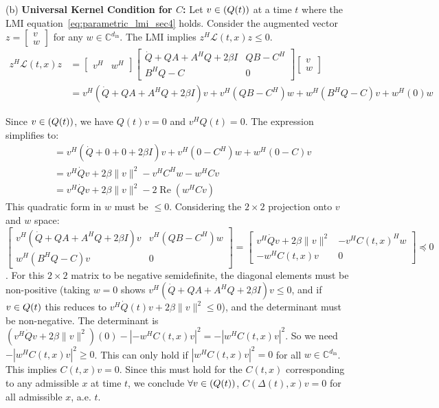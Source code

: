 \documentclass[10pt]{article} %
\def\eqref#1{equation~\ref{#1}}
\DeclareMathOperator{\realPart}{Re}                     %
\let\ker\relax\DeclareMathOperator{\ker}{Ker}           %
\theoremstyle{definition}
\begin{document}
(b) \textbf{Universal Kernel Condition for $C$:} Let $v \in \ker(Q(t))$ at a time $t$ where the LMI \eqref{eq:parametric_lmi_sec4} holds. Consider the augmented vector $z = \begin{bmatrix} v \\ w \end{bmatrix}$ for any $w \in \mathbb{C}^{d_{\mathrm{in}}}$. The LMI implies $z^H \mathcal{L}(t, x) z \le 0$.
\begin{align*} z^H \mathcal{L}(t, x) z &= \begin{bmatrix} v^H & w^H \end{bmatrix} \begin{bmatrix} \dot Q + QA + A^H Q + 2\beta I & QB - C^H \\ B^H Q - C & 0 \end{bmatrix} \begin{bmatrix} v \\ w \end{bmatrix} \\ &= v^H(\dot Q + QA + A^H Q + 2\beta I)v + v^H(QB - C^H)w + w^H(B^H Q - C)v + w^H(0)w \end{align*}

Since $v \in \ker(Q(t))$, we have $Q(t)v = 0$ and $v^H Q(t) = 0$. The expression simplifies to:
\begin{align*} &= v^H(\dot Q + 0 + 0 + 2\beta I)v + v^H(0 - C^H)w + w^H(0 - C)v \\ &= v^H \dot Q v + 2\beta \|v\|^2 - v^H C^H w - w^H C v \\ &= v^H \dot Q v + 2\beta \|v\|^2 - 2 \realPart(w^H C v) \end{align*}
This quadratic form in $w$ must be $\le 0$. Considering the $2 \times 2$ projection onto $v$ and $w$ space:
$\begin{bmatrix} v^H(\dot Q + QA + A^H Q + 2\beta I)v & v^H(QB - C^H)w \\ w^H(B^H Q - C)v & 0 \end{bmatrix} = \begin{bmatrix} v^H \dot Q v + 2\beta \|v\|^2 & -v^H C(t,x)^H w \\ -w^H C(t,x) v & 0 \end{bmatrix} \preceq 0$.
For this $2 \times 2$ matrix to be negative semidefinite, the diagonal elements must be non-positive (taking $w=0$ shows $v^H(\dot Q + QA + A^H Q + 2\beta I)v\le 0$, and if $v\in\ker Q(t)$ this reduces to $v^H\dot Q(t)v + 2\beta\|v\|^2\le 0$), and the determinant must be non-negative. The determinant is $(v^H \dot Q v + 2\beta \|v\|^2)(0) - |-w^H C(t,x) v|^2 = -|w^H C(t,x) v|^2$.
So we need $-|w^H C(t,x) v|^2 \ge 0$. This can only hold if $|w^H C(t,x) v|^2 = 0$ for all $w \in \mathbb{C}^{d_{\mathrm{in}}}$. This implies $C(t,x) v = 0$.
Since this must hold for the $C(t,x)$ corresponding to any admissible $x$ at time $t$, we conclude $\forall v \in \ker(Q(t))$, $C(\Delta(t), x) v = 0$ for all admissible $x$, a.e. $t$.
\end{document}
